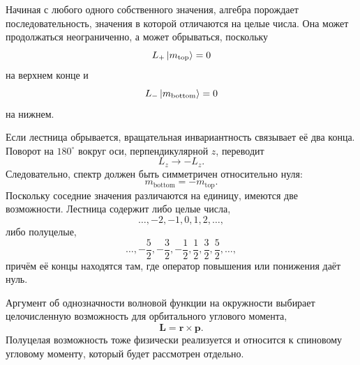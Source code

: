 Начиная с любого одного собственного значения, алгебра порождает последовательность, значения в которой отличаются на целые числа. Она может продолжаться неограниченно, а может обрываться, поскольку
\begin{equation}
L_+\left\lvert m_{\mathrm{top}}\right\rangle=0
\end{equation}
на верхнем конце и
\begin{equation}
L_-\left\lvert m_{\mathrm{bottom}}\right\rangle=0
\end{equation}
на нижнем.

\begin{classroomqa}
\end{classroomqa}

Если лестница обрывается, вращательная инвариантность связывает её два конца. Поворот на \(180^\circ\) вокруг оси, перпендикулярной \(z\), переводит
\begin{equation}
L_z\longrightarrow-L_z.
\end{equation}
Следовательно, спектр должен быть симметричен относительно нуля:
\begin{equation}
m_{\mathrm{bottom}}=-m_{\mathrm{top}}.
\end{equation}
Поскольку соседние значения различаются на единицу, имеются две возможности. Лестница содержит либо целые числа,
\begin{equation}
\ldots,-2,-1,0,1,2,\ldots,
\end{equation}
либо полуцелые,
\begin{equation}
\ldots,-\frac{5}{2},-\frac{3}{2},-\frac{1}{2},
\frac{1}{2},\frac{3}{2},\frac{5}{2},\ldots,
\end{equation}
причём её концы находятся там, где оператор повышения или понижения даёт нуль.

Аргумент об однозначности волновой функции на окружности выбирает целочисленную возможность для орбитального углового момента,
\begin{equation}
\mathbf L=\mathbf r\times\mathbf p.
\end{equation}
Полуцелая возможность тоже физически реализуется и относится к спиновому угловому моменту, который будет рассмотрен отдельно.

